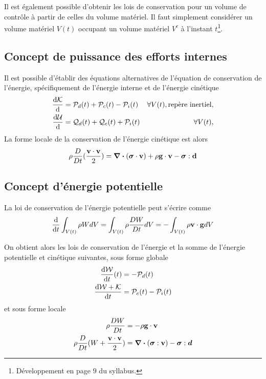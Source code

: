 \documentclass[a4paper,11pt]{report}
\newcommand{\bs}[1]{\boldsymbol{#1}}
\newcommand{\dvm}[2]{\frac{D #1}{D #2}}
\begin{document}
      Il est également possible d'obtenir les lois de conservation pour un volume de contrôle à partir de celles du volume matériel. Il faut simplement considérer un volume matériel $V(t)$ occupant un volume matériel $V^c$ à l'instant $t$\footnote{Développement en page $9$ du syllabus.}.

    \subsection{Concept de puissance des efforts internes}
      Il est possible d'établir des équations alternatives de l'équation de conservation de l'énergie, spécifiquement de l'énergie interne et de l'énergie cinétique
      \begin{equation}\begin{aligned}
        \dv{\mathcal{K}} {}(t) &= \mathcal{P}_d(t) + \mathcal{P}_c(t) - \mathcal{P}_i(t) & \forall V(t), \textrm{repère inertiel},\\
        \dv{\mathcal{U}} {}(t) &= \mathcal{Q}_d(t) + \mathcal{Q}_c(t) + \mathcal{P}_i(t) & \forall V(t),
      \end{aligned}\end{equation}
      La forme locale de la conservation de l'énergie cinétique est alors
      \begin{equation}
        \rho \dvm{}{t}(\frac{\vb{v}\cdot \vb{v}}{2}) = \div (\bs{\sigma} \cdot \vb{v}) + \rho \vb{g} \cdot \vb{v} - \bs{\sigma} : \vb{d}
      \end{equation}

    \subsection{Concept d'énergie potentielle}
      La loi de conservation de l'énergie potentielle peut s'écrire comme
      \begin{equation}
        \dv{t}\int_{V(t)} \rho W dV = \int_{V(t)} \rho \dvm{W}{t} dV = - \int_{V(t)} \rho \vb{v} \cdot \vb{g} dV
      \end{equation}

      On obtient alors les lois de conservation de l'énergie et la somme de l'énergie potentielle et cinétique suivantes, sous forme globale
      \begin{equation}\begin{aligned}
          \dv{\mathcal{W}}{t} {}(t) &= -\mathcal{P}_d(t)\\
          \dv{\mathcal{W} + \mathcal{K}}{t} &= \mathcal{P}_c(t) - \mathcal{P}_i(t)
      \end{aligned}\end{equation}
      et sous forme locale
      \begin{align}
        \rho \dvm{W}{t} &= -\rho \vb{g} \cdot \vb{v}\\
        \rho \dvm{}{t}(W + \frac{\vb{v} \cdot\vb{v}}{2}) &= \div (\bs{\sigma} : \vb{v}) - \bs{\sigma} : \bs{d}\nonumber
      \end{align}
\end{document}
